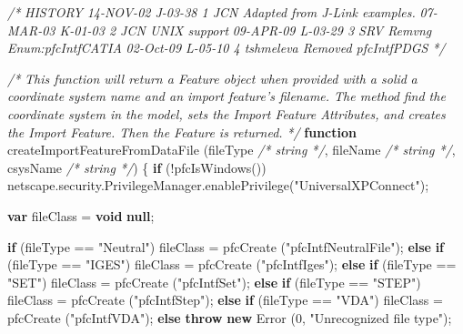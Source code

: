 \documentclass[]{article}
\newenvironment{Shaded}{}{}
\newcommand{\KeywordTok}[1]{\textcolor[rgb]{0.00,0.44,0.13}{\textbf{{#1}}}}
\newcommand{\DecValTok}[1]{\textcolor[rgb]{0.25,0.63,0.44}{{#1}}}
\newcommand{\StringTok}[1]{\textcolor[rgb]{0.25,0.44,0.63}{{#1}}}
\newcommand{\CommentTok}[1]{\textcolor[rgb]{0.38,0.63,0.69}{\textit{{#1}}}}
\newcommand{\OtherTok}[1]{\textcolor[rgb]{0.00,0.44,0.13}{{#1}}}
\newcommand{\FunctionTok}[1]{\textcolor[rgb]{0.02,0.16,0.49}{{#1}}}
\newcommand{\NormalTok}[1]{{#1}}
\begin{document}
\begin{Shaded}
\begin{Highlighting}[]
\CommentTok{/*}
\CommentTok{  HISTORY}
\CommentTok{  }
\CommentTok{  14-NOV-02   J-03-38   $$1   JCN      Adapted from J-Link examples.}
\CommentTok{  07-MAR-03   K-01-03   $$2   JCN      UNIX support}
\CommentTok{  09-APR-09   L-03-29   $$3   SRV      Remvng Enum:pfcIntfCATIA }
\CommentTok{  02-Oct-09   L-05-10   $$4 tshmeleva  Removed pfcIntfPDGS}
\CommentTok{*/}

\CommentTok{/*}
\CommentTok{  This function will return a Feature object when provided with a solid}
\CommentTok{  a coordinate system name and an import feature's filename. The method}
\CommentTok{  find the coordinate system in the model, sets the Import Feature Attributes,}
\CommentTok{  and creates the Import Feature. Then the Feature is returned.}
\CommentTok{*/}
\KeywordTok{function} \FunctionTok{createImportFeatureFromDataFile} \NormalTok{(fileType }\CommentTok{/* string */}\NormalTok{, }
                      \NormalTok{fileName }\CommentTok{/* string */}\NormalTok{,}
                      \NormalTok{csysName }\CommentTok{/* string */}\NormalTok{) }
\NormalTok{\{}
  \KeywordTok{if} \NormalTok{(!}\FunctionTok{pfcIsWindows}\NormalTok{())}
    \OtherTok{netscape}\NormalTok{.}\OtherTok{security}\NormalTok{.}\OtherTok{PrivilegeManager}\NormalTok{.}\FunctionTok{enablePrivilege}\NormalTok{(}\StringTok{"UniversalXPConnect"}\NormalTok{);}
  
  \KeywordTok{var} \NormalTok{fileClass = }\KeywordTok{void} \KeywordTok{null}\NormalTok{;}
  
  \KeywordTok{if} \NormalTok{(fileType == }\StringTok{"Neutral"}\NormalTok{)}
    \NormalTok{fileClass = }\FunctionTok{pfcCreate} \NormalTok{(}\StringTok{"pfcIntfNeutralFile"}\NormalTok{);}
  \KeywordTok{else} \KeywordTok{if} \NormalTok{(fileType == }\StringTok{"IGES"}\NormalTok{)}
    \NormalTok{fileClass = }\FunctionTok{pfcCreate} \NormalTok{(}\StringTok{"pfcIntfIges"}\NormalTok{);}
  \KeywordTok{else} \KeywordTok{if} \NormalTok{(fileType == }\StringTok{"SET"}\NormalTok{)}
    \NormalTok{fileClass = }\FunctionTok{pfcCreate} \NormalTok{(}\StringTok{"pfcIntfSet"}\NormalTok{);}
  \KeywordTok{else} \KeywordTok{if} \NormalTok{(fileType == }\StringTok{"STEP"}\NormalTok{)}
    \NormalTok{fileClass = }\FunctionTok{pfcCreate} \NormalTok{(}\StringTok{"pfcIntfStep"}\NormalTok{);}
  \KeywordTok{else} \KeywordTok{if} \NormalTok{(fileType == }\StringTok{"VDA"}\NormalTok{)}
    \NormalTok{fileClass = }\FunctionTok{pfcCreate} \NormalTok{(}\StringTok{"pfcIntfVDA"}\NormalTok{);}
  \KeywordTok{else}
    \KeywordTok{throw} \KeywordTok{new} \FunctionTok{Error} \NormalTok{(}\DecValTok{0}\NormalTok{, }\StringTok{"Unrecognized file type"}\NormalTok{);}
  

\end{Highlighting}
\end{Shaded}
\end{document}
